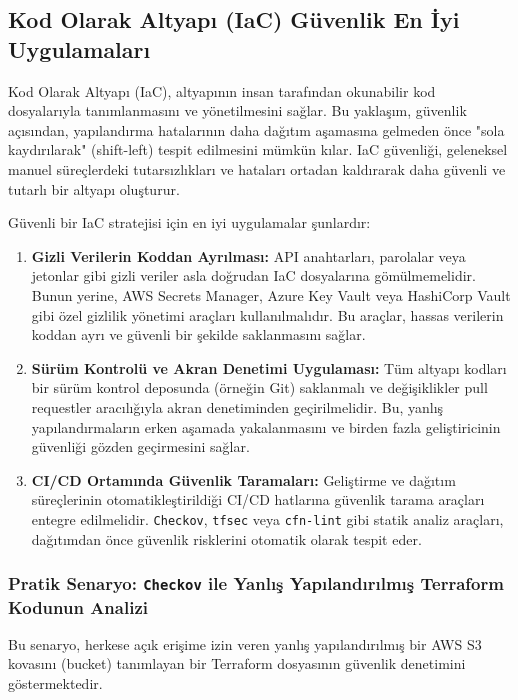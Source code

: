 \subsection{Kod Olarak Altyapı (IaC) Güvenlik En İyi Uygulamaları}

Kod Olarak Altyapı (IaC), altyapının insan tarafından okunabilir kod dosyalarıyla tanımlanmasını ve yönetilmesini sağlar. Bu yaklaşım, güvenlik açısından, yapılandırma hatalarının daha dağıtım aşamasına gelmeden önce "sola kaydırılarak" (shift-left) tespit edilmesini mümkün kılar. IaC güvenliği, geleneksel manuel süreçlerdeki tutarsızlıkları ve hataları ortadan kaldırarak daha güvenli ve tutarlı bir altyapı oluşturur.

Güvenli bir IaC stratejisi için en iyi uygulamalar şunlardır:

\begin{enumerate}
    \item \textbf{Gizli Verilerin Koddan Ayrılması:} API anahtarları, parolalar veya jetonlar gibi gizli veriler asla doğrudan IaC dosyalarına gömülmemelidir. Bunun yerine, AWS Secrets Manager, Azure Key Vault veya HashiCorp Vault gibi özel gizlilik yönetimi araçları kullanılmalıdır. Bu araçlar, hassas verilerin koddan ayrı ve güvenli bir şekilde saklanmasını sağlar.
    \item \textbf{Sürüm Kontrolü ve Akran Denetimi Uygulaması:} Tüm altyapı kodları bir sürüm kontrol deposunda (örneğin Git) saklanmalı ve değişiklikler pull requestler aracılığıyla akran denetiminden geçirilmelidir. Bu, yanlış yapılandırmaların erken aşamada yakalanmasını ve birden fazla geliştiricinin güvenliği gözden geçirmesini sağlar.
    \item \textbf{CI/CD Ortamında Güvenlik Taramaları:} Geliştirme ve dağıtım süreçlerinin otomatikleştirildiği CI/CD hatlarına güvenlik tarama araçları entegre edilmelidir. \texttt{Checkov}, \texttt{tfsec} veya \texttt{cfn-lint} gibi statik analiz araçları, dağıtımdan önce güvenlik risklerini otomatik olarak tespit eder.
\end{enumerate}

\subsubsection*{Pratik Senaryo: \texttt{Checkov} ile Yanlış Yapılandırılmış Terraform Kodunun Analizi}

Bu senaryo, herkese açık erişime izin veren yanlış yapılandırılmış bir AWS S3 kovasını (bucket) tanımlayan bir Terraform dosyasının güvenlik denetimini göstermektedir.

